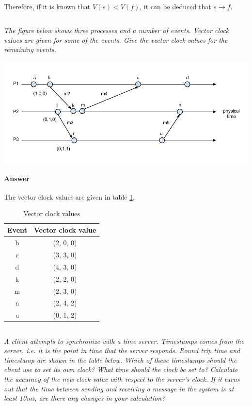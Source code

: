 \documentclass{article}
\newcommand{\question}[1]{\subsection{}\textit{#1}\bigskip}
\newcommand{\answer}{\paragraph{Answer}}
\begin{document}
Therefore, if it is known that $ V(e) < V(f) $, it can be deduced that $ e \rightarrow f $.

\question{The figure below shows three processes and a number of events. Vector clock values are given for some of the events. Give the vector clock values for the remaining events.}

\includegraphics[width=\textwidth]{images/T3-2.png}

\answer
The vector clock values are given in table \ref{table:vector-clock-values}.

\begin{table}[H]
    \centering
    \begin{tabular}{c | c}
        Event & Vector clock value \\
        \hline
        b & (2, 0, 0) \\
        c & (3, 3, 0) \\
        d & (4, 3, 0) \\
        k & (2, 2, 0) \\
        m & (2, 3, 0) \\
        n & (2, 4, 2) \\
        u & (0, 1, 2) \\
    \end{tabular}
    \caption{Vector clock values}
    \label{table:vector-clock-values}
\end{table}

\question{A client attempts to synchronize with a time server. Timestamps comes from the server, i.e. it is the point in time that the server responds. Round trip time and timestamp are shown in the table below. Which of these timestamps should the client use to set its own clock? What time should the clock be set to? Calculate the accuracy of the new clock value with respect to the server's clock. If it turns out that the time between sending and receiving a message in the system is at least 10ms, are there any changes in your calculation?}
\end{document}
